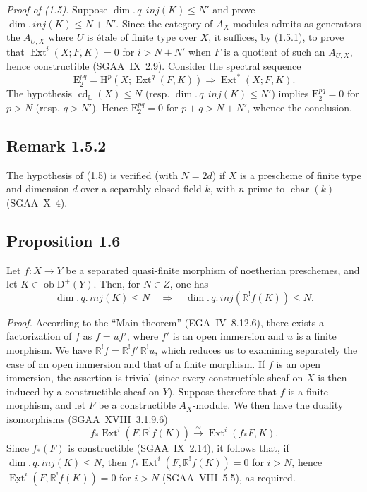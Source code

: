 \documentclass[11pt]{article}
\renewcommand{\H}{\mathrm{H}}
\DeclareMathOperator{\Ext}{Ext}
\DeclareMathOperator{\cd}{cd}
\newcommand{\D}{\mathrm{D}}
\newcommand{\E}{\mathrm{E}}
\newcommand{\ob}{\operatorname{ob}}
\newcommand{\charac}{\operatorname{char}}
\providecommand{\ob}{\operatorname{ob}}
\begin{document}
\emph{Proof of (1.5).} Suppose $\dim.\,q.\,inj(K) \leqslant N'$ and prove $\dim.\,inj(K) \leqslant N + N'$. Since the category of $A_X$-modules admits as generators the $A_{U,X}$ where $U$ is étale of finite type over $X$, it suffices, by (1.5.1), to prove that $\Ext^i(X; F,K) = 0$ for $i > N + N'$ when $F$ is a quotient of such an $A_{U,X}$, hence constructible (SGAA~IX~2.9). Consider the spectral sequence
\[
\E_2^{pq} = \H^p(X; \underline{\Ext}^q(F,K)) \Rightarrow \Ext^{*}(X; F,K).
\]
The hypothesis $\cd_{\mathbb{L}}(X) \leqslant N$ (resp. $\dim.\,q.\,inj(K) \leqslant N'$) implies $\E_2^{pq} = 0$ for $p > N$ (resp. $q > N'$). Hence $\E_2^{pq} = 0$ for $p+q > N+N'$, whence the conclusion.

\subsection*{Remark 1.5.2}
The hypothesis of (1.5) is verified (with $N = 2d$) if $X$ is a prescheme of finite type and dimension $d$ over a separably closed field $k$, with $n$ prime to $\charac(k)$ (SGAA~X~4).

\subsection*{Proposition 1.6}
Let $f : X \to Y$ be a separated quasi-finite morphism of noetherian preschemes, and let $K \in \ob \D^{+}(Y)$. Then, for $N \in Z$, one has
\[
\dim.\,q.\,inj(K) \leqslant N \quad \Longrightarrow \quad \dim.\,q.\,inj(\mathbb{R}^{!}f(K)) \leqslant N.
\]

\emph{Proof.} According to the ``Main theorem'' (EGA~IV~8.12.6), there exists a factorization of $f$ as $f = uf'$, where $f'$ is an open immersion and $u$ is a finite morphism. We have $\mathbb{R}^{!}f = \mathbb{R}^{!}f' \, \mathbb{R}^{!}u$, which reduces us to examining separately the case of an open immersion and that of a finite morphism. If $f$ is an open immersion, the assertion is trivial (since every constructible sheaf on $X$ is then induced by a constructible sheaf on $Y$). Suppose therefore that $f$ is a finite morphism, and let $F$ be a constructible $A_X$-module. We then have the duality isomorphisms (SGAA~XVIII~3.1.9.6)
\[
f_{*}\underline{\Ext}^i(F, \mathbb{R}^{!}f(K)) \xrightarrow{\sim} \underline{\Ext}^i(f_{*}F, K).
\]
Since $f_{*}(F)$ is constructible (SGAA~IX~2.14), it follows that, if $\dim.\,q.\,inj(K) \leqslant N$, then $f_{*}\underline{\Ext}^i(F, \mathbb{R}^{!}f(K)) = 0$ for $i > N$, hence $\underline{\Ext}^i(F, \mathbb{R}^{!}f(K)) = 0$ for $i > N$ (SGAA~VIII~5.5), as required.
\end{document}
